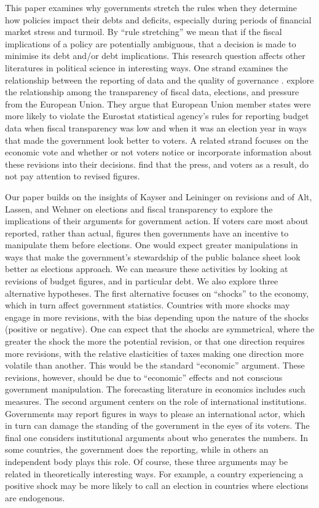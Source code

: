 \documentclass[]{article}
\begin{document}
This paper examines why governments stretch the rules when they determine how policies impact their debts and deficits, especially during periods of financial market stress and turmoil. By ``rule stretching'' we mean that if the fiscal implications of a policy are potentially ambiguous, that a decision is made to minimise its debt and/or debt implications. This research question affects other literatures in political science in interesting ways. One strand examines the relationship between the reporting of data and the quality of governance \cite[e.g.][]{Hollyer2014}. \cite{Alt2014} explore the relationship among the transparency of fiscal data, elections, and pressure from the European Union. They argue that European Union member states were more likely to violate the Eurostat statistical agency's rules for reporting budget data when fiscal transparency was low and when it was an election year in ways that made the government look better to voters. A related strand focuses on the economic vote and whether or not voters notice or incorporate information about these revisions into their decisions. \cite{KayserLeininger2015} find that the press, and voters as a result, do not pay attention to revised figures.

Our paper builds on the insights of Kayser and Leininger on revisions and of Alt, Lassen, and Wehner on elections and fiscal transparency to explore the implications of their arguments for government action. If voters care most about reported, rather than actual, figures then governments have an incentive to manipulate them before elections. One would expect greater manipulations in ways that make the government's stewardship of the public balance sheet look better as elections approach. We can measure these activities by looking at revisions of budget figures, and in particular debt. We also explore three alternative hypotheses. The first alternative focuses on ``shocks'' to the economy, which in turn affect government statistics. Countries with more shocks may engage in more revisions, with the bias depending upon the nature of the shocks (positive or negative). One can expect that the shocks are symmetrical, where the greater the shock the more the potential revision, or that one direction requires more revisions, with  the relative elasticities of taxes making one direction more volatile than another. This would be the standard ``economic'' argument. These revisions, however, should be due to ``economic'' effects and not conscious government manipulation. The forecasting literature in economics includes such measures. The second argument centers on the role of international institutions. Governments may report figures in ways to please an international actor, which in turn can damage the standing of the government in the eyes of its voters. The final one considers institutional arguments about who generates the numbers. In some countries, the government does the reporting, while in others an independent body plays this role.  Of course, these three arguments may be related in theoretically interesting ways. For example, a country experiencing a positive shock may be more likely to call an election in countries where elections are endogenous.
\end{document}
